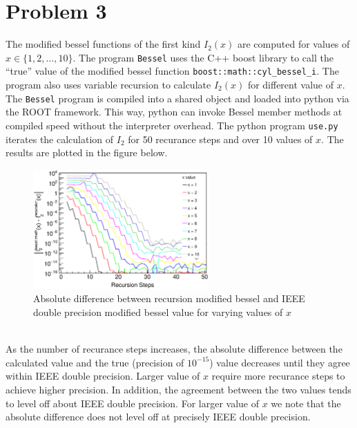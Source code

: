 \documentclass[singlepage,notitlepage,nofootinbib,11pt]{revtex4-1}
\begin{document}
\section{Problem 3}
The modified bessel functions of the first kind $I_2(x)$ are computed for values of $x\in\{1,2,\dots,10\}$. The program \verb|Bessel| uses the C++ boost library to call the ``true'' value of the modified bessel function \verb|boost::math::cyl_bessel_i|. The program also uses variable recursion to calculate $I_2(x)$ for different value of $x$. The \verb|Bessel| program is compiled into a shared object and loaded into python via the ROOT framework. This way, python can invoke Bessel member methods at compiled speed without the interpreter overhead. The python program \verb|use.py| iterates the calculation of $I_2$ for 50 recurance steps and over 10 values of $x$. The results are plotted in the figure below. 
\begin{figure}[h]
\centering
\includegraphics[width=0.6\textwidth]{figures/modified_bessel.eps}
\caption{Absolute difference between recursion modified bessel and IEEE double precision modified bessel value for varying values of $x$}
\end{figure}\\
\indent As the number of recurance steps increases, the absolute difference between the calculated value and the true (precision of $10^{-15}$) value decreases until they agree within IEEE double precision. Larger value of $x$ require more recurance steps to achieve higher precision. In addition, the agreement between the two values tends to level off about IEEE double precision. For larger value of $x$ we note that the absolute difference does not level off at precisely IEEE double precision.
\end{document}
